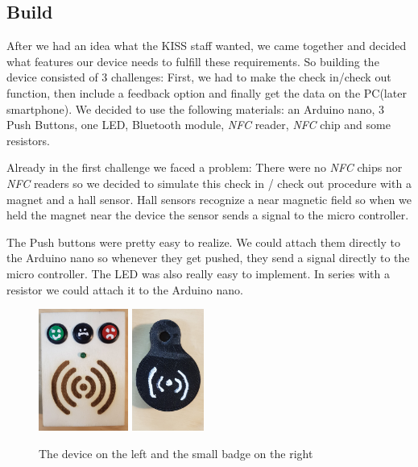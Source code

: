 \documentclass[12pt]{report}
\begin{document}
\subsection{Build}



After we had an idea what the KISS staff wanted, we came together and decided what features our device needs to fulfill these requirements. So building the device consisted of 3 challenges: First, we had to make the check in/check out function, then include a feedback option and finally get the data on the PC(later smartphone). We decided to use the following materials: an Arduino nano, 3 Push Buttons, one LED, Bluetooth module, \emph{NFC} reader, \emph{NFC} chip and some resistors.


Already in the first challenge we faced a problem: There were no \emph{NFC} chips nor \emph{NFC} readers so we decided to simulate this check in / check out procedure with a magnet and a hall sensor. Hall sensors recognize a near magnetic field so when we held the magnet near the device the sensor sends a signal to the micro controller.

The Push buttons were pretty easy to realize. We could attach them directly to the Arduino nano so whenever they get pushed, they send a signal directly to the micro controller. The LED was also really easy to implement. In series with a resistor we could attach it to the Arduino nano.

\begin{figure}
	\includegraphics[height=4cm]{devicelatex.jpg}
    \includegraphics[height=4cm]{badgelatex.jpg}
	\caption{The device on the left and the small badge on the right}
	\label{label:manometer}
\end{figure}
\end{document}
